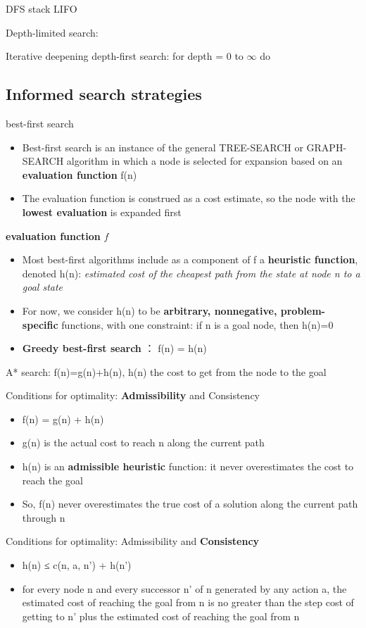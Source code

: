 \documentclass[11pt]{article}
\begin{document}
DFS stack LIFO


Depth-limited search: 


Iterative deepening depth-first search: for depth = 0 to \(\infty\) do

\subsection{Informed search strategies}
\label{sec:orgfca65b1}
best-first search
\begin{itemize}
\item Best-first search is an instance of the general TREE-SEARCH or GRAPH-SEARCH
algorithm in which a node is selected for expansion based on an \textbf{evaluation
function} f(n)
\item The evaluation function is construed as a cost estimate, so the node with
the \textbf{lowest evaluation} is expanded first
\end{itemize}


\textbf{evaluation function} \(f\)
\begin{itemize}
\item Most best-first algorithms include as a component of f a \textbf{heuristic
function}, denoted h(n): \emph{estimated cost of the cheapest path from the state 
at node n to a goal state}
\item For now, we consider h(n) to be \textbf{arbitrary, nonnegative, problem-specific}
functions, with one constraint: if n is a goal node, then h(n)=0
\item \textbf{Greedy best-first search} ： f(n) = h(n)
\end{itemize}


A* search:
f(n)=g(n)+h(n), h(n) the cost to get from the node to the goal


Conditions for optimality: \textbf{Admissibility} and Consistency
\begin{itemize}
\item f(n) = g(n) + h(n)
\item g(n) is the actual cost to reach n along the current path
\item h(n) is an \textbf{admissible heuristic} function: it never overestimates the cost
to reach the goal
\item So, f(n) never overestimates the true cost of a solution along the current
path through n
\end{itemize}


Conditions for optimality: Admissibility and \textbf{Consistency}
\begin{itemize}
\item h(n) ≤ c(n, a, n') + h(n')
\item for every node n and every successor n’ of n generated by any action a,
the estimated cost of reaching the goal from n is no greater than the step
cost of getting to n’ plus the estimated cost of reaching the goal from n
\end{itemize}
\end{document}
